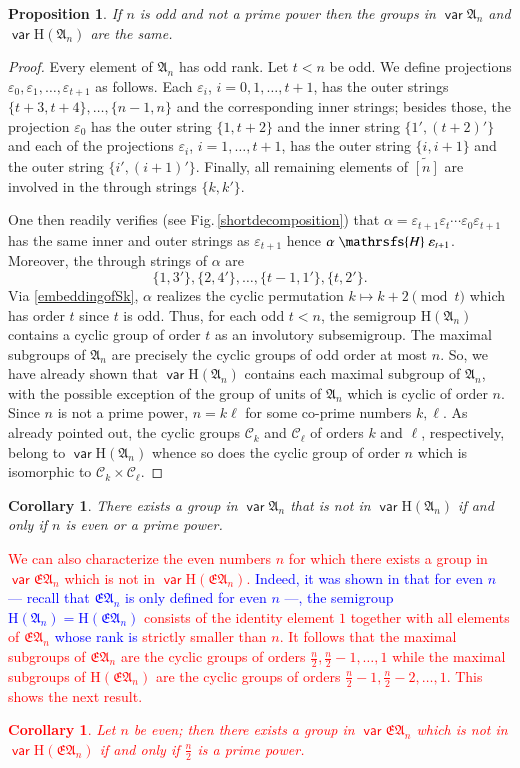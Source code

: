 \documentclass[preprint,1p,times]{elsarticle}
\DeclareMathOperator{\var}{\mathsf{var}}
\numberwithin{equation}{section}
\newtheorem{Prop}[Thm]{Proposition}
\newtheorem{Cor}[Thm]{Corollary}
\theoremstyle{remark}
\def\red#1{\textcolor{red}{#1}}
\def\blue#1{\textcolor{blue}{#1}}
\def\Hc{\mathrsfs{H}}
\def\al{\alpha}
\def\ep{\varepsilon}
\def\H{\mathrm H}
\def\A{\mathfrak{A}}
\def\wt{\widetilde}
\begin{document}
\begin{Prop}
\label{noprimepowerodd} If $n$ is odd and not a prime power then the groups in $\var\A_n$ and $\var\H(\A_n)$ are the
same.
\end{Prop}
\begin{proof} Every element of $\A_n$ has odd rank. Let $t<n$ be odd.
We define projections $\ep_0,\ep_1,\dots,\ep_{t+1}$ as follows. Each $\ep_i$, $i=0,1,\dots,t+1$, has the outer strings
$\{t+3,t+4\},\dots,\{n-1,n\}$ and the corresponding inner strings; besides those, the projection $\ep_0$ has the outer
string $\{1,t+2\}$ and the inner string $\{1',(t+2)'\}$ and each of the projections $\ep_i$, $i=1,\dots,t+1$, has the
outer string $\{i,i+1\}$ and the outer string $\{i',(i+1)'\}$. Finally, all remaining elements of $\wt{[n]}$ are
involved in the through strings  $\{k,k'\}$.

One then readily verifies (see Fig.\,\ref{shortdecomposition}) that $\al=\ep_{t+1}\ep_t\cdots \ep_0\ep_{t+1}$ has the
same inner and outer strings as $\ep_{t+1}$ hence $\al\mathrel{\Hc}\ep_{t+1}$. Moreover, the through strings of $\al$
are
$$\{1,3'\},\{2,4'\},\dots,\{t-1,1'\},\{t,2'\}.$$
Via \eqref{embeddingofSk}, $\al$ realizes the cyclic permutation $k\mapsto k+2\!\pmod{t}$ which has order $t$ since $t$
is odd. Thus, for each odd $t<n$, the semigroup $\H(\A_n)$ contains a cyclic group of order $t$ as an involutory subsemigroup.
The maximal subgroups of $\A_n$ are precisely the cyclic groups of odd order at most $n$. So, we have already shown
that $\var\H(\A_n)$ contains each maximal subgroup of $\A_n$, with the possible exception of the group of units of
$\A_n$ which is cyclic of order $n$. Since $n$ is not a prime power, $n=k\ell$ for some co-prime numbers $k,\ell$. As
already pointed out, the cyclic groups $\mathcal{C}_k$ and $\mathcal{C}_\ell$ of orders $k$ and $\ell$, respectively,
belong to $\var\H(\A_n)$ whence so does the cyclic group of order $n$ which is isomorphic to $\mathcal{C}_k
\times\mathcal{C}_\ell$.
\end{proof}
\begin{Cor} There exists a group in $\var\A_n$ that is not in
$\var\H(\A_n)$ if and only if $n$ is even or a prime power.
\end{Cor}

\red{We can also characterize the even numbers $n$ for which there exists a group in $\var\mathfrak{EA}_n$ which is not in $\var\H(\mathfrak{EA}_n)$. \blue{Indeed, it was shown in \cite{complexity} that for even $n$ --- recall that $\mathfrak{EA}_n$ is only defined for even $n$ ---,  the semigroup $\H(\A_n)=\H(\mathfrak{EA}_n)$} consists of the identity element $1$ together with all elements of $\mathfrak{EA}_n$ \blue{whose rank is} strictly smaller than $n$. It follows that the maximal subgroups of $\mathfrak{EA}_n$ are the cyclic groups of orders $\frac n2, \frac n2 -1,\dots, 1$ while the maximal subgroups of $\H(\mathfrak{EA}_n)$ are the cyclic groups of orders $\frac n2 -1,\frac n2-2,\dots,1$. This shows the next result.
\begin{Cor} Let $n$ be even; then there exists a group in $\var\mathfrak{EA}_n$ which is not in $\var\H(\mathfrak{EA}_n)$ if and only if $\frac n2$ is a prime power.
\end{Cor}
}
\end{document}

